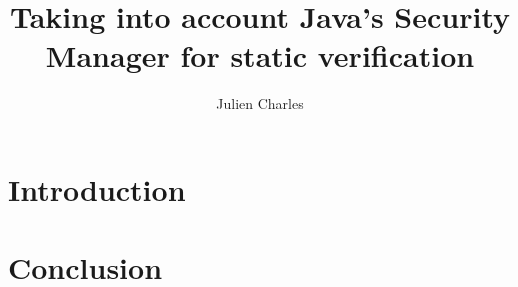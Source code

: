 \documentclass[draft]{llncs}
\begin{document}
\makeatletter
\newcommand{\addToLabel}[1]{%
  \protected@edef\@currentlabel{\@currentlabel#1}%
}\makeatother
{}
\renewcommand{\therule}{}
\newcommand{\rlabel}[1]{\refstepcounter{rule}\addToLabel{#1}\label{#1}#1}
\newcommand{\rref}[1]{{\small\sc\ref{#1}}}

\newcommand{\rarrow}{$\rightarrow$}
\newcommand{\conj}{$\wedge$}
\newcommand{\disjonc}{$\vee$}
\newcommand{\s}{\,}
\newcommand{\btab}{\begin{tt}\begin{tabbing}}
\newcommand{\etab}{\end{tabbing}\end{tt}}
\newcommand{\bcode}{\begin{tt}\begin{small}\begin{tabbing}}
\newcommand{\ecode}{\end{tabbing}\end{small}\end{tt}}


%
\frontmatter %
%

\mainmatter %
%
\title{Taking into account Java's Security Manager for static
verification}
%
%
\author{Julien Charles}
%
%
%

\maketitle %

\begin{abstract}

\end{abstract}
%
\section{Introduction}









%



\section{Conclusion}
\label{conclusion}




%
%




%
\end{document}
